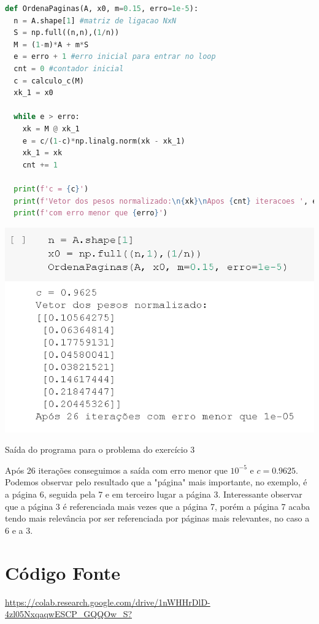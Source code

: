\documentclass[a4paper, 12pt]{article}
\begin{document}
\begin{lstlisting}[language=Python, caption=Algoritmo para a ordenação de páginas até um certo erro]
def OrdenaPaginas(A, x0, m=0.15, erro=1e-5):
  n = A.shape[1] #matriz de ligacao NxN
  S = np.full((n,n),(1/n))
  M = (1-m)*A + m*S
  e = erro + 1 #erro inicial para entrar no loop
  cnt = 0 #contador inicial
  c = calculo_c(M)
  xk_1 = x0 

  while e > erro:
    xk = M @ xk_1
    e = c/(1-c)*np.linalg.norm(xk - xk_1)
    xk_1 = xk 
    cnt += 1
  
  print(f'c = {c}')
  print(f'Vetor dos pesos normalizado:\n{xk}\nApos {cnt} iteracoes ', end='')
  print(f'com erro menor que {erro}')
\end{lstlisting}

\begin{center}
    \includegraphics[width=16cm]{Saida_ordena2.PNG}
    
    Saída do programa para o problema do exercício 3
\end{center}

Após 26 iterações conseguimos a saída com erro menor que $10^{-5}$ e $c=0.9625$. Podemos observar pelo resultado que a "página" mais importante, no exemplo, é a página 6, seguida pela 7 e em terceiro lugar a página 3. Interessante observar que a página 3 é referenciada mais vezes que a página 7, porém a página 7 acaba tendo mais relevância por ser referenciada por páginas mais relevantes, no caso a 6 e a 3.

\section{Código Fonte}
\href{https://colab.research.google.com/drive/1nWHHrDlD-4zl05NxqaqwESCP_GQQOw_S?usp=sharing}{https://colab.research.google.com/drive/1nWHHrDlD-4zl05NxqaqwESCP\_GQQOw\_S?}
\end{document}
